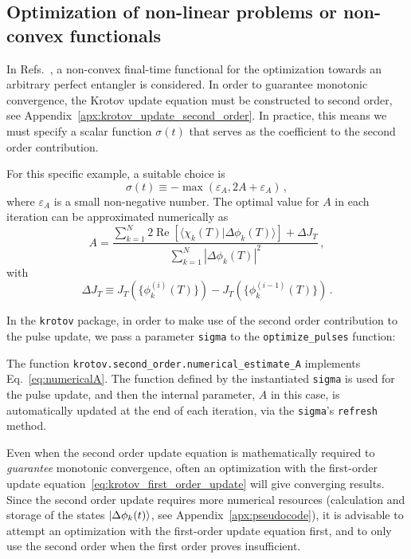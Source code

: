 \documentclass[submission, Phys]{SciPost}
\newcommand{\Abs}[1]{\left\vert#1\right\vert}
\renewcommand{\Re}[0]{\operatorname{Re}}
\begin{document}
\subsection{Optimization of non-linear problems or non-convex functionals}%
\label{sec:task_second_order}

In Refs.~\cite{WattsPRA2015,GoerzPRA2015}, a non-convex final-time functional
for the optimization towards an arbitrary perfect entangler is considered.
In order to guarantee monotonic convergence, the Krotov update equation must be
constructed to second order, see Appendix~\ref{apx:krotov_update_second_order}.
In practice, this means we must specify a scalar function $\sigma(t)$ that
serves as the coefficient to the second order contribution.

For this specific example, a suitable choice is
\begin{equation}
  \sigma(t) \equiv -\max\left(\varepsilon_A,2A+\varepsilon_A\right)\,,
\end{equation}
where \(\varepsilon_A\) is a small non-negative number.
The optimal value for \(A\) in each iteration can be approximated numerically
as~\cite{ReichJCP12}
\begin{equation}
  \label{eq:numericalA}
  A = \frac{
    \sum_{k=1}^{N} 2 \Re\left[
      \langle \chi_k(T) \vert \Delta\phi_k(T) \rangle \right] + \Delta J_T}{
    \sum_{k=1}^{N} \Abs{\Delta\phi_k(T)}^2} \,,
\end{equation}
with
\begin{equation}
  \Delta J_T \equiv J_T(\{\phi_k^{(i)}(T)\}) -J_T(\{\phi_k^{(i-1)}(T)\})\,.
\end{equation}

In the \texttt{krotov} package, in order to make use of the second order
contribution to the pulse update, we pass a parameter \texttt{sigma} to the
\texttt{optimize\_pulses} function:

The function \texttt{krotov.second\_order.numerical\_estimate\_A} implements
Eq.~\eqref{eq:numericalA}.
The function defined by the instantiated \texttt{sigma} is used for the pulse
update, and then the internal parameter, $A$ in this case, is automatically
updated at the end of each iteration, via the \texttt{sigma}'s \texttt{refresh}
method.

Even when the second order update equation is mathematically required to
\emph{guarantee} monotonic convergence, often an optimization with the
first-order update equation~\eqref{eq:krotov_first_order_update} will give
converging results.
Since the second order update requires more numerical resources (calculation and
storage of the states \(\ket{\Delta\phi_k(t)}\), see
Appendix~\ref{apx:pseudocode}), it is advisable to attempt an optimization with
the first-order update equation first, and to only use the second order when the
first order proves insufficient.
\end{document}
